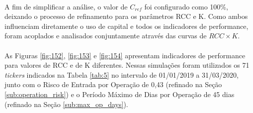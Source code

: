 

\paragraph{} A fim de simplificar a análise, o valor de \begin{math} C_{ref} \end{math} foi configurado como 100\%, deixando o processo de refinamento para os parâmetros RCC e K. Como ambos influenciam diretamente o uso de capital e todos os indicadores de performance, foram acoplados e analisados conjuntamente através das curvas de \begin{math} RCC \times K \end{math}.

\paragraph{} As Figuras \ref{fig:152}, \ref{fig:153} e \ref{fig:154} apresentam indicadores de performance para valores de RCC e de K diferentes. Nessas simulações foram utilizados os 71 \textit{tickers} indicados na Tabela \ref{tab:5} no intervalo de 01/01/2019 a 31/03/2020, junto com o Risco de Entrada por Operação de 0,43 (refinado na Seção \ref{sub:operation_risk}) e o Período Máximo de Dias por Operação de 45 dias (refinado na Seção \ref{sub:max_op_days}).

